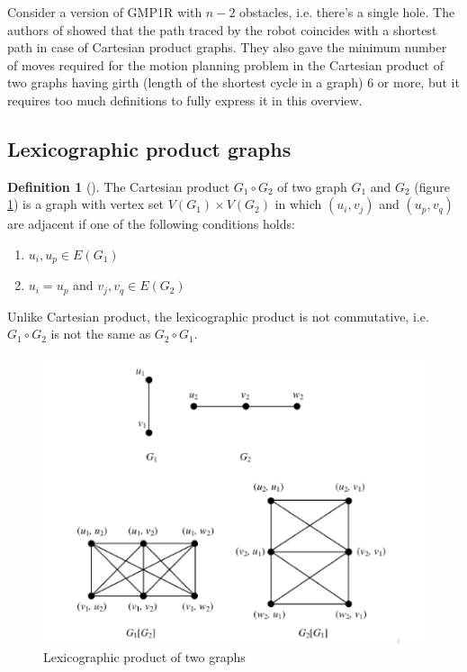 \documentclass[12pt, a4paper]{article}
\theoremstyle{definition}
\newtheorem{definition}{Definition}[section]
\begin{document}
Consider a version of GMP1R with $n-2$ obstacles, i.e. there’s
a single hole. The authors of \cite{deb2014motion} showed that the
path traced by the robot coincides with a shortest path in case of Cartesian product graphs.
They also gave the minimum number of moves required for the motion planning problem in the Cartesian product of two graphs having 
girth (length of the shortest cycle in a graph) 6 or more,
but it requires too much definitions to fully express it in this overview.

\subsection*{Lexicographic product graphs}

\begin{definition}[]
  The Cartesian product $G_1 \circ G_2$ of two graph $G_1$ and $G_2$ (figure \ref{lexic}) is a graph with vertex set $V(G_1) \times V(G_2)$ in which
  $(u_i, v_j)$ and $(u_p, v_q)$ are adjacent if one of the
  following conditions holds:

  \begin{enumerate}
    \item ${u_i,u_p} \in E(G_1)$
    \item $u_i = u_p$ and ${v_j,v_q} \in E(G_2)$
  \end{enumerate}
  Unlike Cartesian product, the lexicographic product is not commutative,
  i.e. $G_1 \circ G_2$ is not the same as $G_2 \circ G_1$.
\end{definition}

\begin{figure}[H]
  \begin{center}
  \includegraphics[scale=0.7]{Lexic.png}
  \caption{Lexicographic product of two graphs}
  \label{lexic}
  \end{center}
\end{figure}
\end{document}

